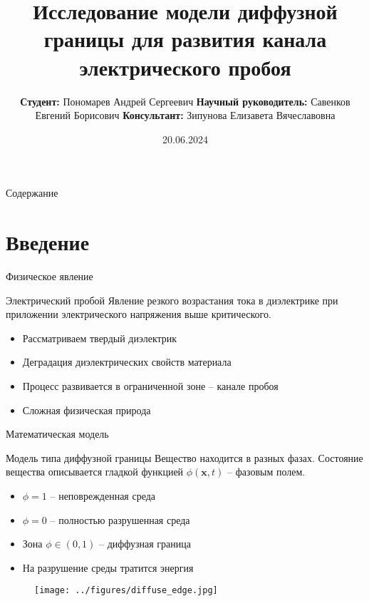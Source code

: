 \documentclass[aspectratio=169]{beamer}
\title[Электрический пробой]{Исследование модели диффузной границы для развития канала
	электрического пробоя}
\author{
	\raggedright
	\hfill \break
	\hspace*{8cm}
	\textbf{Студент:} \linebreak
	\hspace*{8cm}
	\vspace{0.3cm}
	Пономарев Андрей Сергеевич \linebreak
	\hspace*{8cm}
	\textbf{Научный руководитель:} \linebreak
	\hspace*{8cm}
	\vspace{0.3cm}
	Савенков Евгений Борисович
	\hspace*{8cm}
	\textbf{Консультант:} \linebreak
	\hspace*{8cm}
	Зипунова Елизавета Вячеславовна
}
\date[]{20.06.2024}
\begin{document}


\begin{frame}
\titlepage
\end{frame}


\begin{frame}{Содержание}
\Large
\tableofcontents
\end{frame}


\section{Введение}

\begin{frame}{Физическое явление}
\begin{block}{Электрический пробой}
	Явление резкого возрастания тока в диэлектрике при приложении электрического напряжения
	выше критического.
\end{block}
\begin{itemize}
	\item Рассматриваем твердый диэлектрик
	\item Деградация диэлектрических свойств материала
	\item Процесс развивается в ограниченной зоне -- канале пробоя
	\item Сложная физическая природа
\end{itemize}
\end{frame}


\begin{frame}{Математическая модель}
\begin{block}{Модель типа диффузной границы}
	Вещество находится в разных фазах. Состояние вещества описывается гладкой функцией
	$\phi(\textbf{x}, t)$ -- фазовым полем.
\end{block}
\begin{itemize}
	\item $\phi = 1$ -- неповрежденная среда
	\item $\phi = 0$ -- полностью разрушенная среда
	\item Зона $\phi \in (0, 1)$ -- диффузная граница
	\item На разрушение среды тратится энергия
\end{itemize}
\begin{figure}
	\texttt{[image: ../figures/diffuse\_edge.jpg]}
\end{figure}
\end{frame}
\end{document}
